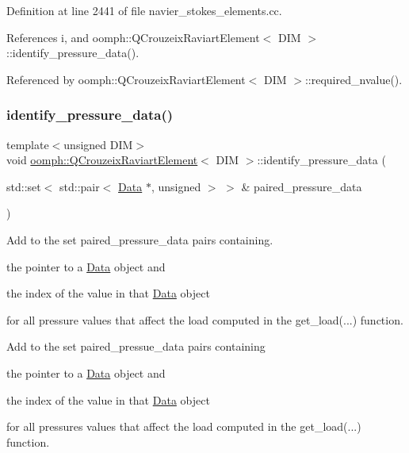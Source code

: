 Definition at line 2441 of file navier\+\_\+stokes\+\_\+elements.\+cc.



References i, and oomph\+::\+Q\+Crouzeix\+Raviart\+Element$<$ D\+I\+M $>$\+::identify\+\_\+pressure\+\_\+data().



Referenced by oomph\+::\+Q\+Crouzeix\+Raviart\+Element$<$ D\+I\+M $>$\+::required\+\_\+nvalue().

\mbox{\label{classoomph_1_1QCrouzeixRaviartElement_ad01a1d2af20703dfb57971bfba4d376e}} 
\subsubsection{\texorpdfstring{identify\+\_\+pressure\+\_\+data()}{identify\_pressure\_data()}}
{\footnotesize\ttfamily template$<$unsigned D\+IM$>$ \\
void \hyperlink{classoomph_1_1QCrouzeixRaviartElement}{oomph\+::\+Q\+Crouzeix\+Raviart\+Element}$<$ D\+IM $>$\+::identify\+\_\+pressure\+\_\+data (\begin{DoxyParamCaption}\item[{std\+::set$<$ std\+::pair$<$ \hyperlink{classoomph_1_1Data}{Data} $\ast$, unsigned $>$ $>$ \&}]{paired\+\_\+pressure\+\_\+data }\end{DoxyParamCaption})\hspace{0.3cm}{\ttfamily [virtual]}}



Add to the set {\ttfamily paired\+\_\+pressure\+\_\+data} pairs containing. 


\begin{DoxyItemize}
\item the pointer to a \hyperlink{classoomph_1_1Data}{Data} object and
\item the index of the value in that \hyperlink{classoomph_1_1Data}{Data} object
\end{DoxyItemize}for all pressure values that affect the load computed in the {\ttfamily get\+\_\+load}(...) function.

Add to the set {\ttfamily paired\+\_\+pressue\+\_\+data} pairs containing
\begin{DoxyItemize}
\item the pointer to a \hyperlink{classoomph_1_1Data}{Data} object and
\item the index of the value in that \hyperlink{classoomph_1_1Data}{Data} object
\end{DoxyItemize}for all pressures values that affect the load computed in the {\ttfamily get\+\_\+load}(...) function. 

